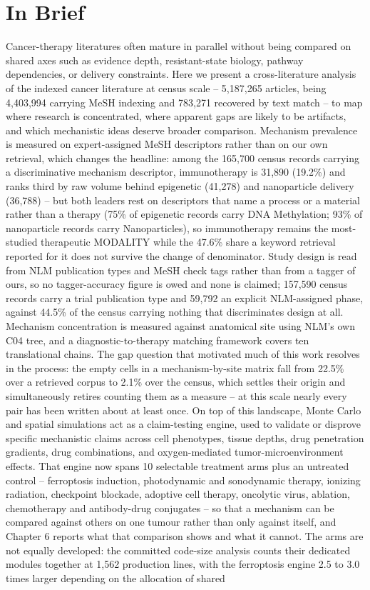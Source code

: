 \documentclass[11pt,twoside,openright]{report}
\begin{document}
\chapter*{In Brief}
Cancer-therapy literatures often mature in parallel without being compared on shared axes such as evidence depth, resistant-state biology, pathway dependencies, or delivery constraints. Here we present a cross-literature analysis of the indexed cancer literature at census scale -- 5,187,265 articles, being 4,403,994 carrying MeSH indexing and 783,271 recovered by text match -- to map where research is concentrated, where apparent gaps are likely to be artifacts, and which mechanistic ideas deserve broader comparison. Mechanism prevalence is measured on expert-assigned MeSH descriptors rather than on our own retrieval, which changes the headline: among the 165,700 census records carrying a discriminative mechanism descriptor, immunotherapy is 31,890 (19.2\%) and ranks third by raw volume behind epigenetic (41,278) and nanoparticle delivery (36,788) -- but both leaders rest on descriptors that name a process or a material rather than a therapy (75\% of epigenetic records carry DNA Methylation; 93\% of nanoparticle records carry Nanoparticles), so immunotherapy remains the most-studied therapeutic MODALITY while the 47.6\% share a keyword retrieval reported for it does not survive the change of denominator. Study design is read from NLM publication types and MeSH check tags rather than from a tagger of ours, so no tagger-accuracy figure is owed and none is claimed; 157,590 census records carry a trial publication type and 59,792 an explicit NLM-assigned phase, against 44.5\% of the census carrying nothing that discriminates design at all. Mechanism concentration is measured against anatomical site using NLM's own C04 tree, and a diagnostic-to-therapy matching framework covers ten translational chains. The gap question that motivated much of this work resolves in the process: the empty cells in a mechanism-by-site matrix fall from 22.5\% over a retrieved corpus to 2.1\% over the census, which settles their origin and simultaneously retires counting them as a measure -- at this scale nearly every pair has been written about at least once. On top of this landscape, Monte Carlo and spatial simulations act as a claim-testing engine, used to validate or disprove specific mechanistic claims across cell phenotypes, tissue depths, drug penetration gradients, drug combinations, and oxygen-mediated tumor-microenvironment effects. That engine now spans 10 selectable treatment arms plus an untreated control -- ferroptosis induction, photodynamic and sonodynamic therapy, ionizing radiation, checkpoint blockade, adoptive cell therapy, oncolytic virus, ablation, chemotherapy and antibody-drug conjugates -- so that a mechanism can be compared against others on one tumour rather than only against itself, and Chapter 6 reports what that comparison shows and what it cannot. The arms are not equally developed: the committed code-size analysis counts their dedicated modules together at 1,562 production lines, with the ferroptosis engine 2.5 to 3.0 times larger depending on the allocation of shared 
\end{document}
